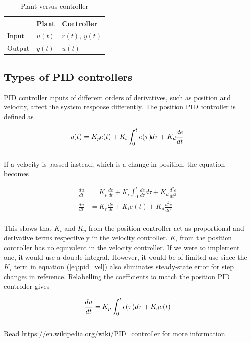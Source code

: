 \documentclass[10pt,conference,compsoc]{IEEEtran}
\begin{document}
\begin{table}[ht]
  \caption{Plant versus controller}
  \renewcommand{\arraystretch}{1.3}
  \centering
  \begin{tabular}{|l|ll|}
    \hline
    & \textbf{Plant} & \textbf{Controller} \\
    \hline
    Input & $u(t)$ & $r(t)$, $y(t)$ \\
    Output & $y(t)$ & $u(t)$ \\
    \hline
  \end{tabular}
  \label{tab:plant_v_controller}
\end{table}

\subsection{Types of PID controllers}

PID controller inputs of different orders of derivatives, such as position and
velocity, affect the \gls{system} response differently. The position PID
controller is defined as

\begin{equation}
  u(t) = K_p e(t) + K_i \int_0^t e(\tau) d\tau + K_d \frac{de}{dt} \\
\end{equation}
\\
If a velocity is passed instead, which is a change in position, the equation
becomes

\begin{align}
  \frac{du}{dt} &= K_p \frac{de}{dt} + K_i \int_0^t \frac{de}{d\tau} d\tau +
    K_d \frac{d^2e}{dt^2} \nonumber \\
  \frac{du}{dt} &= K_p \frac{de}{dt} + K_i e(t) + K_d \frac{d^2e}{dt^2}
    \label{eq:pid_vel}
\end{align}
\\
This shows that $K_i$ and $K_p$ from the position controller act as proportional
and derivative terms respectively in the velocity controller. $K_i$ from the
position controller has no equivalent in the velocity controller. If we were to
implement one, it would use a double integral. However, it would be of limited
use since the $K_i$ term in equation (\ref{eq:pid_vel}) also eliminates
steady-state error for step changes in \gls{reference}. Relabelling the
coefficients to match the position PID controller gives

\begin{equation}
  \frac{du}{dt} = K_p \int_0^t e(\tau) d\tau + K_d e(t) \\
\end{equation}
\\
Read \url{https://en.wikipedia.org/wiki/PID_controller} for more information.
\end{document}
